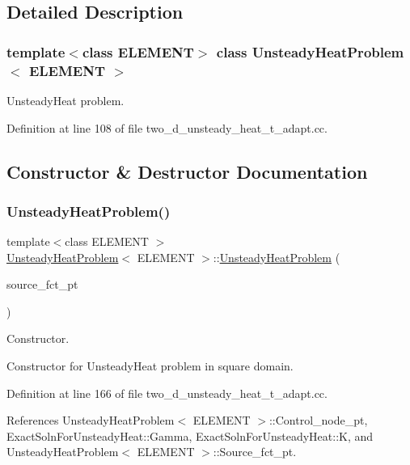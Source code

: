 \subsection{Detailed Description}
\subsubsection*{template$<$class E\+L\+E\+M\+E\+NT$>$\newline
class Unsteady\+Heat\+Problem$<$ E\+L\+E\+M\+E\+N\+T $>$}

Unsteady\+Heat problem. 

Definition at line 108 of file two\+\_\+d\+\_\+unsteady\+\_\+heat\+\_\+t\+\_\+adapt.\+cc.



\subsection{Constructor \& Destructor Documentation}
\mbox{\label{classUnsteadyHeatProblem_abd3a46eea132b1e5872be6a6309a51b2}} 
\subsubsection{\texorpdfstring{Unsteady\+Heat\+Problem()}{UnsteadyHeatProblem()}}
{\footnotesize\ttfamily template$<$class E\+L\+E\+M\+E\+NT $>$ \\
\hyperlink{classUnsteadyHeatProblem}{Unsteady\+Heat\+Problem}$<$ E\+L\+E\+M\+E\+NT $>$\+::\hyperlink{classUnsteadyHeatProblem}{Unsteady\+Heat\+Problem} (\begin{DoxyParamCaption}\item[{Unsteady\+Heat\+Equations$<$ 2 $>$\+::Unsteady\+Heat\+Source\+Fct\+Pt}]{source\+\_\+fct\+\_\+pt }\end{DoxyParamCaption})}



Constructor. 

Constructor for Unsteady\+Heat problem in square domain. 

Definition at line 166 of file two\+\_\+d\+\_\+unsteady\+\_\+heat\+\_\+t\+\_\+adapt.\+cc.



References Unsteady\+Heat\+Problem$<$ E\+L\+E\+M\+E\+N\+T $>$\+::\+Control\+\_\+node\+\_\+pt, Exact\+Soln\+For\+Unsteady\+Heat\+::\+Gamma, Exact\+Soln\+For\+Unsteady\+Heat\+::K, and Unsteady\+Heat\+Problem$<$ E\+L\+E\+M\+E\+N\+T $>$\+::\+Source\+\_\+fct\+\_\+pt.

